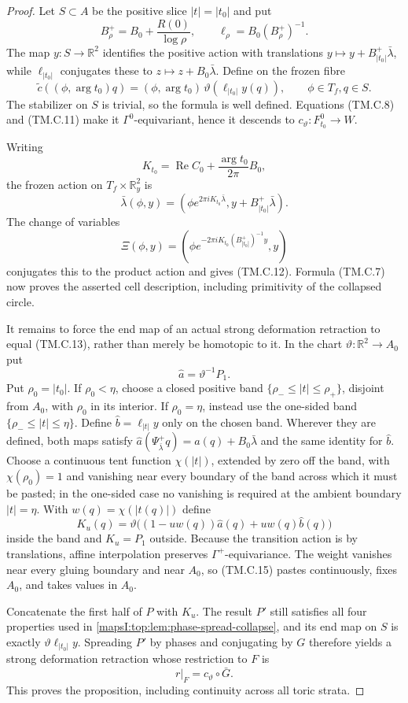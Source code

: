 \begin{proof}
Let $S\subset A$ be the positive slice $|t|=|t_0|$ and put
\[
 B_\rho^+=B_0+\frac{R(0)}{\log\rho},\qquad
 \ell_\rho=B_0(B_\rho^+)^{-1}.
\]
The map $y:S\to\mathbb R^2$ identifies the positive action with translations
$y\mapsto y+B_{|t_0|}^+\bar\lambda$, while $\ell_{|t_0|}$ conjugates these to
$z\mapsto z+B_0\bar\lambda$.  Define on the frozen fibre
\[
 \widetilde c((\phi,\arg t_0)q)=
 (\phi,\arg t_0)\,
 \vartheta(\ell_{|t_0|}y(q)),\qquad \phi\in T_f, q\in S.
\tag{TM.C.13}
\]
The stabilizer on $S$ is trivial, so the formula is well defined.  Equations
(TM.C.8) and (TM.C.11) make it $\Gamma^0$-equivariant, hence it descends to
$c_\vartheta:F_{t_0}^0\to W$.

Writing
\[
 K_{t_0}=\operatorname{Re}C_0+\frac{\arg t_0}{2\pi}B_0,
\]
the frozen action on $T_f\times\mathbb R_y^2$ is
\[
 \bar\lambda(\phi,y)=
 (\phi e^{2\pi iK_{t_0}\bar\lambda},
  y+B_{|t_0|}^+\bar\lambda).
\]
The change of variables
\[
 \Xi(\phi,y)=
 (\phi e^{-2\pi iK_{t_0}(B_{|t_0|}^+)^{-1}y},y)
\tag{TM.C.14}
\]
conjugates this to the product action and gives (TM.C.12).  Formula (TM.C.7) now
proves the asserted cell description, including primitivity of the collapsed
circle.

It remains to force the end map of an actual strong deformation retraction to
equal (TM.C.13), rather than merely be homotopic to it.  In the chart
$\vartheta:\mathbb R^2\to A_0$ put
\[
 \widehat a=\vartheta^{-1}P_1.
\]
Put $\rho_0=|t_0|$.  If $\rho_0<\eta$, choose a closed positive band
$\{\rho_-\leq |t|\leq\rho_+\}$, disjoint from $A_0$, with $\rho_0$ in its
interior.  If $\rho_0=\eta$, instead use the one-sided band
$\{\rho_-\leq |t|\leq\eta\}$.  Define
$\widehat b=\ell_{|t|}y$ only on the chosen band.  Wherever they are defined,
both maps satisfy
$\widehat a(\Psi^+_{\bar\lambda}q)=\widehat a(q)+B_0\bar\lambda$ and the same
identity for $\widehat b$.  Choose a continuous tent function $\chi(|t|)$,
extended by zero off the band, with $\chi(\rho_0)=1$ and vanishing near every
boundary of the band across which it must be pasted; in the one-sided case no
vanishing is required at the ambient boundary $|t|=\eta$.  With
$w(q)=\chi(|t(q)|)$ define
\[
 K_u(q)=\vartheta\bigl((1-uw(q))\widehat a(q)
                         +uw(q)\widehat b(q)\bigr)
\tag{TM.C.15}
\]
inside the band and $K_u=P_1$ outside.  Because the transition action is by
translations, affine interpolation preserves $\Gamma^+$-equivariance.  The
weight vanishes near every gluing boundary and near $A_0$, so (TM.C.15) pastes
continuously, fixes $A_0$, and takes values in $A_0$.

Concatenate the first half of $P$ with $K_u$.  The result $P'$ still satisfies
all four properties used in \cref{mapsI:top:lem:phase-spread-collapse}, and its end map
on $S$ is exactly $\vartheta\ell_{|t_0|}y$.  Spreading $P'$ by phases and
conjugating by $G$ therefore yields a strong deformation retraction whose
restriction to $F$ is
\[
 r|_F=c_\vartheta\circ\bar G.
\]
This proves the proposition, including continuity across all toric strata.
\end{proof}

